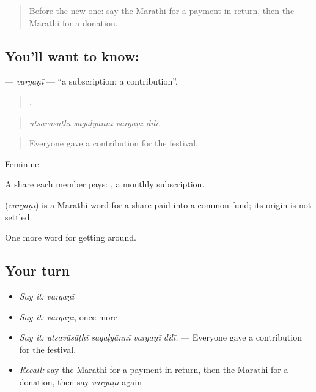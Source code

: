 \label{lesson:MR-C430-vargani}



\begin{quote}
Before the new one: say the Marathi for a payment in return, then the Marathi for a donation.
\end{quote}

\subsection*{You'll want to know: }
\textbf{} — \emph{vargaṇī} — \textquotedblleft{}a subscription; a contribution\textquotedblright{}.

\begin{quote}
   .
\end{quote}

\begin{quote}
\emph{utsavāsāṭhī sagaḷyānnī vargaṇī dilī.}
\end{quote}

\begin{quote}
Everyone gave a contribution for the festival.
\end{quote}

Feminine.

A share each member pays:  , a monthly subscription.

\begin{cousinweb}
\textbf{} (\emph{vargaṇī}) is a Marathi word for a share paid into a common fund; its origin is not settled.
\end{cousinweb}

\begin{grammarlens}[title={What you've built}]
One more word for getting around.
\end{grammarlens}

\subsection*{Your turn}
\begin{itemize}
\raggedright
  \item \emph{Say it:} \emph{vargaṇī}
  \item \emph{Say it:} \emph{vargaṇī}, once more
  \item \emph{Say it:} \emph{utsavāsāṭhī sagaḷyānnī vargaṇī dilī.} — Everyone gave a contribution for the festival.
  \item \emph{Recall:} say the Marathi for a payment in return, then the Marathi for a donation, then say \emph{vargaṇī} again
\end{itemize}

